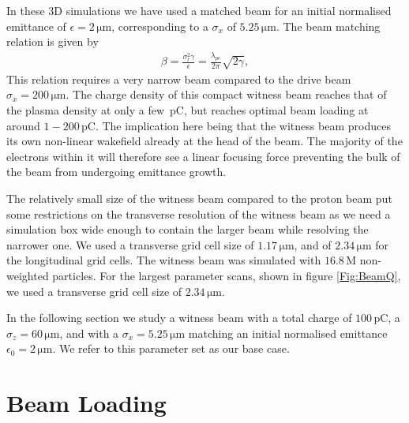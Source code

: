 \documentclass[aps,prstab,reprint,amsmath,amssymb,groupedaddress]{revtex4-1}
\newcommand{\unit}[1]{\,\mathrm{#1}}
\begin{document}
In these 3D simulations we have used a matched beam for an initial normalised emittance of $\epsilon = 2\unit{\mu m}$,
corresponding to a $\sigma_{x}$ of $5.25\unit{\mu m}$. The beam matching relation is given by
\begin{align}
    \beta = \frac{\sigma_r^2\gamma}{\epsilon} = \frac{\lambda_{pe}}{2\pi}\sqrt{2\gamma}, \label{EQ:Matched}
\end{align}
This relation requires a very narrow beam compared to the drive beam $\sigma_{x} = 200\unit{\mu m}$. The charge density
of this compact witness beam reaches that of the plasma density at only a few $\unit{pC}$, but reaches optimal beam
loading at around $1-200\unit{pC}$. The implication here being that the witness beam produces its own non-linear
wakefield already at the head of the beam. The majority of the electrons within it will therefore see a linear focusing
force preventing the bulk of the beam from undergoing emittance growth.

The relatively small size of the witness beam compared to the proton beam put some restrictions on the transverse
resolution of the witness beam as we need a simulation box wide enough to contain the larger beam while resolving the
narrower one. We used a transverse grid cell size of $1.17\unit{\mu m}$, and of $2.34\unit{\mu m}$ for the longitudinal
grid cells. The witness beam was simulated with $16.8\unit{M}$ non-weighted particles. For the largest parameter scans,
shown in figure \ref{Fig:BeamQ}, we used a transverse grid cell size of $2.34\unit{\mu m}$.

In the following section we study a witness beam with a total charge of $100\unit{pC}$, a $\sigma_{z}=60\unit{\mu m}$,
and with a $\sigma_{x}=5.25\unit{\mu m}$ matching an initial normalised emittance $\epsilon_{0} = 2\unit{\mu m}$. We
refer to this parameter set as our base case.

\section[\label{S:BL}]{Beam Loading}
\end{document}
